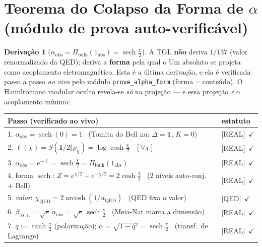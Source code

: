 \documentclass[11pt]{article}
\newcommand{\bTGL}{\beta_{\mathrm{TGL}}}\newcommand{\Msun}{M_{\odot}}\newcommand{\TGL}{\mathrm{TGL}}
\theoremstyle{definition}\newtheorem{deriv}{Derivação}
\begin{document}
\section{Teorema do Colapso da Forma de $\alpha$ (módulo de prova auto-verificável)}\label{sec:colapso-forma}

\begin{deriv}[$\alpha_{\mathrm{obs}}=\Pi_{\mathrm{bulk}}(1_{\mathrm{abs}})=\operatorname{sech}\tfrac\chi2$]

A TGL \textbf{não} deriva $1/137$ (valor renormalizado da QED); deriva a \textbf{forma} pela qual o Um absoluto se projeta como acoplamento eletromagnético. Esta é a última derivação, e ela é verificada passo a passo \emph{ao vivo} pelo módulo \texttt{prove\_alpha\_form} (forma$=$conteúdo). O Hamiltoniano modular oculto revela-se \emph{só} na projeção --- e essa projeção \emph{é} o acoplamento mínimo:

\begin{center}\small\begin{tabular}{p{} l}\hline

\textbf{Passo (verificado ao vivo)} & \textbf{estatuto} \\\hline

1. $\alpha_{\mathrm{abs}}=\operatorname{sech}(0)=1$ \ (Tomita do Bell nu: $\Delta=\mathbf 1$, $K=0$) & \textsf{[REAL]}~$\checkmark$ \\

2. $\ell(\chi)=S(\mathbf 1/2\Vert\rho_\chi)=\log\cosh\tfrac\chi2$ \ $[\forall\chi]$ & \textsf{[REAL]}~$\checkmark$ \\

3. $\alpha_{\mathrm{obs}}=e^{-\ell}=\operatorname{sech}\tfrac\chi2=\Pi_{\mathrm{bulk}}(1_{\mathrm{abs}})$ & \textsf{[REAL]}~$\checkmark$ \\

4. forma $\operatorname{sech}$: $Z=e^{\chi/2}+e^{-\chi/2}=2\cosh\tfrac\chi2$ \ (2 níveis auto-conj.\ $+$ Bell) & \textsf{[REAL]}~$\checkmark$ \\

5. \emph{valor}: $\chi_{\mathrm{QED}}=2\operatorname{arcosh}(1/\alpha_{\mathrm{QED}})$ \ (QED fixa o valor) & \textsf{[QED]}~$\checkmark$ \\

6. $\bTGL=\sqrt e\,\alpha_{\mathrm{obs}}=\sqrt e\,\operatorname{sech}\tfrac\chi2$ \ (Meia-Nat marca a dimensão) & \textsf{[REAL]}~$\checkmark$ \\

7. $q:=\tanh\tfrac\chi2$ (polarização); $\alpha=\sqrt{1-q^2}=\operatorname{sech}\tfrac\chi2$ \ (transf.\ de Lagrange) & \textsf{[REAL]}~$\checkmark$ \\


\end{tabular}
\end{center}
\end{deriv}
\end{document}
